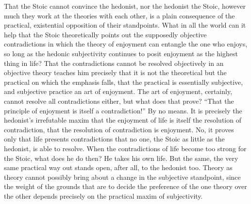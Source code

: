 \documentclass[12pt]{book}
\newcommand{\opage}[1]{\marginnote{\footnotesize\textit{[#1]}}}
\begin{document}
That the Stoic cannot convince the hedonist, nor the hedonist the Stoic,
however much they work at the theories with each other, is a plain
consequence of the practical, existential opposition of their standpoints.
What in all the world can it help that the Stoic theoretically points out
the supposedly objective contradictions in which the theory of enjoyment can
entangle the one who enjoys, so long as the hedonic subjectivity continues to
posit enjoyment as the highest thing in life? That the contradictions cannot
be resolved objectively in an objective theory teaches him precisely that it
is not the theoretical but the practical on which the
\opage{15}\setcounter{footnote}{0}%
emphasis falls, that the practical is essentially subjective, and subjective
practice an art of enjoyment. The art of enjoyment, certainly, cannot resolve
all contradictions either, but what does that prove? ``That the principle of
enjoyment is itself a contradiction!'' By no means. It is precisely the
hedonist's irrefutable maxim that the enjoyment of life is itself the
resolution of contradiction, that the resolution of contradiction is
enjoyment. No, it proves only that life presents contradictions that no one,
the Stoic as little as the hedonist, is able to resolve. When the
contradictions of life become too strong for the Stoic, what does he do then?
He takes his own life. But the same, the very same practical way out stands
open, after all, to the hedonist too. Theory as theory cannot possibly bring
about a change in the subjective standpoint, since the weight of the grounds
that are to decide the preference of the one theory over the other depends
precisely on the practical maxim of subjectivity.
\end{document}
